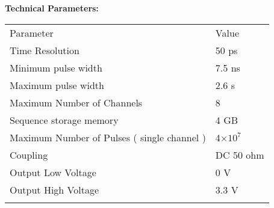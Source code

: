 \vspace{0.4cm}
\noindent\xiaosi\textbf{Technical Parameters:}
\vspace{0.1cm}
\begin{table}[H]
{}
\begin{tabular}{m{6.5cm}|m{6.5cm}}
\rowcolor{myblue}
\color{white}Parameter& \color{white}Value\\\arrayrulecolor{tabcolor}\midrule[1.2pt]
Time Resolution& 50 ps\\\arrayrulecolor{tabcolor}\midrule[1.2pt]
Minimum pulse width& 7.5 ns \\\arrayrulecolor{tabcolor}\midrule[1.2pt]
Maximum pulse width& 2.6 s\\\arrayrulecolor{tabcolor}\midrule[1.2pt]
Maximum Number of Channels& 8\\\arrayrulecolor{tabcolor}\midrule[1.2pt]
Sequence storage memory& 4 GB\\\arrayrulecolor{tabcolor}\midrule[1.2pt]
Maximum Number of Pulses ( single channel )&  4×$10^{7}$\\\midrule[1.2pt]
Coupling& DC 50 ohm\\\arrayrulecolor{tabcolor}\midrule[1.2pt]
Output Low Voltage& 0 V\\\arrayrulecolor{tabcolor}\midrule[1.2pt]
Output High Voltage& 3.3 V\\\arrayrulecolor{tabcolor}\midrule[1.2pt]
\end{tabular}
\end{table}



